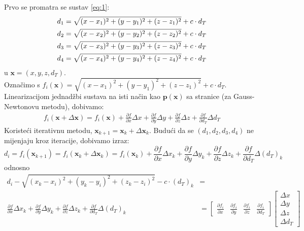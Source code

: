 \documentclass[a4paper,twoside,12pt]{memoir} %
\begin{document}
Prvo se promatra se sustav \ref{eq:1}:
\begin{align}\label{eq:1partial}
d_1 = \sqrt{(x-x_1)^{2}+(y-y_1)^{2}+(z-z_1)^{2}} + c\cdot d_T \notag \\
d_2 = \sqrt{(x-x_2)^{2}+(y-y_2)^{2}+(z-z_2)^{2}} + c\cdot d_T  \\
d_3 = \sqrt{(x-x_3)^{2}+(y-y_3)^{2}+(z-z_3)^{2}} + c\cdot d_T \notag \\
d_4 = \sqrt{(x-x_4)^{2}+(y-y_4)^{2}+(z-z_4)^{2}} + c\cdot d_T \notag
\end{align}
u $\mathbf{x} = (x,y,z,d_T)$.\\
Označimo s $f_i(\mathbf{x}) = \sqrt{(x-x_1)^{2}+(y-y_1)^{2}+(z-z_1)^{2}} + c\cdot d_T$.\\
Linearizacijom jednadžbi sustava na isti način kao $\mathbf{p}(\mathbf{x})$ sa stranice \pageref{stranica:NGLin} (za Gauss-Newtonovu metodu), dobivamo:
\begin{align*}
f_i(\mathbf{x} + \Delta\mathbf{x}) = f_i(\mathbf{x}) + \frac{\partial f}{\partial x}\Delta x + \frac{\partial f}{\partial y}\Delta y + \frac{\partial f}{\partial z}\Delta z + \frac{\partial f}{\partial d_T}\Delta d_T 
\end{align*}
Koristeći iterativnu metodu, $\mathbf{x}_{k+1} = \mathbf{x}_k+\Delta\mathbf{x}_k$.
Budući da se $(d_1,d_2,d_3,d_4)$ ne mijenjaju kroz iteracije, dobivamo izraz:
$$
d_i = f_i(\mathbf{x}_{k+1}) = f_i(\mathbf{x}_{k} + \Delta\mathbf{x}_{k}) = f_i(\mathbf{x}_{k}) + \frac{\partial f}{\partial x}\Delta x_k + \frac{\partial f}{\partial y}\Delta y_k + \frac{\partial f}{\partial z}\Delta z_k + \frac{\partial f}{\partial d_T}\Delta (d_T)_k 
$$odnosno
\begin{align*}
d_i - \sqrt{(x_k-x_i)^{2}+(y_k-y_i)^{2}+(z_k-z_i)^{2}} - c\cdot (d_T)_k & = \\
\frac{\partial f}{\partial x}\Delta x_k + \frac{\partial f}{\partial y}\Delta y_k + \frac{\partial f}{\partial z}\Delta z_k + \frac{\partial f}{\partial d_T}\Delta (d_T)_k &= 
\begin{bmatrix}
\frac{\partial f_i}{\partial x} &
\frac{\partial f_i}{\partial y} &
\frac{\partial f_i}{\partial z} &
\frac{\partial f_i}{\partial d_T}
\end{bmatrix}
\begin{bmatrix}
\Delta x \\
\Delta y \\
\Delta z \\
\Delta d_T
\end{bmatrix} \\ 
\end{align*}
\end{document}
